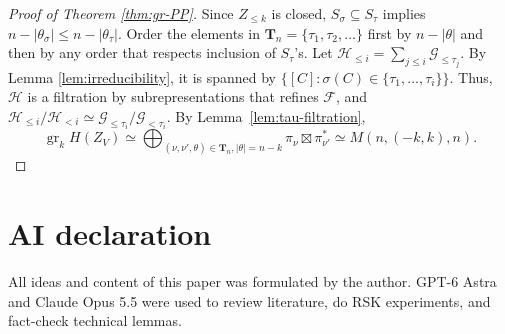 \documentclass[12pt,a4paper]{article}
\theoremstyle{plain}
\theoremstyle{definition}
\theoremstyle{remark}
\newcommand{\gr}{\operatorname{gr}}
\newcommand{\cF}{\mathcal{F}}
\newcommand{\cG}{\mathcal{G}}
\newcommand{\cH}{\mathcal{H}}
\newcommand{\bfT}{\mathbf{T}}
\begin{document}
    \begin{proof}[Proof of Theorem \ref{thm:gr-PP}]
        Since $Z_{\le k}$ is closed, $S_\sigma\subseteq S_\tau$ implies $n-|\theta_\sigma|\le n-|\theta_\tau|$. Order the elements in $\bfT_n = \{\tau_1,\tau_2,\ldots\}$ first by $n-|\theta|$ and then by any order that respects inclusion of $S_\tau$'s. Let $\cH_{\leq i}=\sum_{j\leq i}\cG_{\leq \tau_j}$. By Lemma \ref{lem:irreducibility}, it is spanned by $\{[C]:\sigma(C) \in \{\tau_1,\dots,\tau_i\}\}$. Thus, $\cH$ is a filtration by subrepresentations that refines $\cF$, and $\cH_{\leq i}/\cH_{<i}\simeq\cG_{\leq \tau_i}/\cG_{<\tau_i}$. By Lemma~\ref{lem:tau-filtration},
        \[
        \gr_k H(Z_V) \simeq \bigoplus_{(\nu,\nu',\theta)\in \bfT_n, |\theta| = n-k} \pi_\nu \boxtimes \pi^*_{\nu'} \simeq M(n,(-k,k),n).
        \]
    \end{proof}

\section*{AI declaration}

    All ideas and content of this paper was formulated by the author. GPT-6 Astra and Claude Opus 5.5 were used to review literature, do RSK experiments, and fact-check technical lemmas.


    


\end{document}
